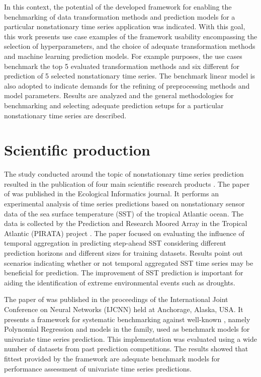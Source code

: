 \documentclass[11pt]{dippg}
\begin{document}
In this context, the potential of the developed framework for enabling the benchmarking of data transformation methods and prediction models for a particular nonstationary time series application was indicated. With this goal, this work presents use case examples of the framework usability encompassing the selection of hyperparameters, and the choice of adequate transformation methods and machine learning prediction models. For example purposes, the use cases benchmark the top 5 evaluated transformation methods and six different  for prediction of 5 selected nonstationary time series. The benchmark linear  model is also adopted to indicate demands for the refining of preprocessing methods and model parameters. Results are analyzed and the general methodologies for benchmarking and selecting adequate prediction setups for a particular nonstationary time series are described.

\section*{Scientific production}

The study conducted around the topic of nonstationary time series prediction resulted in the publication of four main scientific research products \cite{salles_evaluating_2016,salles_framework_2017,salles_tspred:_2018,salles_nonstationary_2019}. The paper of \textcite{salles_evaluating_2016} was published in the Ecological Informatics journal. It performs an experimental analysis of time series predictions based on nonstationary sensor data of the sea surface temperature (SST) of the tropical Atlantic ocean. The data is collected by the Prediction and Research Moored Array in the Tropical Atlantic (PIRATA) project \cite{goos-brasil_pirata_2015}. The paper focused on evaluating the influence of temporal aggregation in predicting step-ahead SST considering different prediction horizons and different sizes for training datasets. Results point out scenarios indicating whether or not temporal aggregated SST time series may be beneficial for prediction. The improvement of SST prediction is important for aiding the identification of extreme environmental events such as droughts.

The paper of \textcite{salles_framework_2017} was published in the proceedings of the International Joint Conference on Neural Networks (IJCNN) held at Anchorage, Alaska, USA. It presents a framework for systematic benchmarking  against well-known , namely Polynomial Regression and models in the  family, used as benchmark models for univariate time series prediction. This implementation was evaluated using a wide number of datasets from past prediction competitions. The results showed that fittest  provided by the framework are adequate benchmark models for performance assessment of univariate time series predictions.
\end{document}
